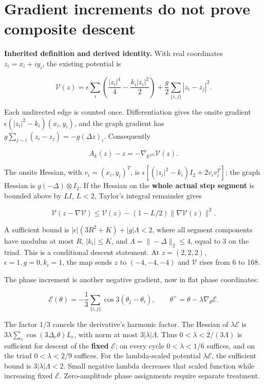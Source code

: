 \documentclass[11pt,a4paper]{article}
\begin{document}
\section{Gradient increments do not prove composite descent}

\textbf{Inherited definition and derived identity.} With real coordinates \(z_i=x_i+iy_i\), the existing potential is

\[
\mathcal V(z)=\epsilon\sum_i\left(\frac{|z_i|^4}{4}
-\frac{k_i|z_i|^2}{2}\right)
+\frac g2\sum_{\{i,j\}}|z_i-z_j|^2.
\tag{D8}\label{eq:D8}
\]

Each undirected edge is counted once. Differentiation gives the onsite gradient \(\epsilon(|z_i|^2-k_i)(x_i,y_i)\), and the graph gradient has \(g\sum_{j\sim i}(z_i-z_j)=-g(\Delta z)_i\). Consequently

\[
A_k(z)-z=-\nabla_{\mathbb R^{2N}}\mathcal V(z).
\tag{D9}\label{eq:D9}
\]

The onsite Hessian, with \(v_i=(x_i,y_i)^T\), is
\(\epsilon[(|z_i|^2-k_i)I_2+2v_iv_i^T]\); the graph Hessian is \(g(-\Delta)\otimes I_2\). If the Hessian on the \textbf{whole actual step segment} is bounded above by \(L I\), \(L<2\), Taylor's integral remainder gives

\[
\mathcal V(z-\nabla\mathcal V)
\le\mathcal V(z)-(1-L/2)\|\nabla\mathcal V(z)\|^2.
\tag{D10}\label{eq:D10}
\]

A sufficient bound is \(|\epsilon|(3R^2+K)+|g|\Lambda<2\), where all segment components have modulus at most \(R\), \(|k_i|\le K\), and \(\Lambda=\|-\Delta\|_2\le4\), equal to 3 on the triad. This is a conditional descent statement. At \(z=(2,2,2)\), \(\epsilon=1,g=0,k_i=1\), the map sends \(z\) to \((-4,-4,-4)\) and \(\mathcal V\) rises from 6 to 168.

The phase increment is another negative gradient, now in flat phase coordinates:

\[
\mathcal E(\theta)=-\frac13\sum_{\{i,j\}}\cos3(\theta_j-\theta_i),
\qquad \theta^+=\theta-\lambda\nabla_\theta\mathcal E.
\tag{D11}\label{eq:D11}
\]

The factor \(1/3\) cancels the derivative's harmonic factor. The Hessian of \(\lambda\mathcal E\) is
\(3\lambda\sum_e\cos(3\Delta_e\theta)L_e\), with norm at most \(3|\lambda|\Lambda\). Thus \(0<\lambda<2/(3\Lambda)\) is sufficient for descent of the \textbf{fixed} \(\mathcal E\); on every cycle \(0<\lambda<1/6\) suffices, and on the triad \(0<\lambda<2/9\) suffices. For the lambda-scaled potential \(\lambda\mathcal E\), the sufficient bound is \(3|\lambda|\Lambda<2\). Small negative lambda decreases that scaled function while increasing fixed \(\mathcal E\). Zero-amplitude phase assignments require separate treatment.
\end{document}
